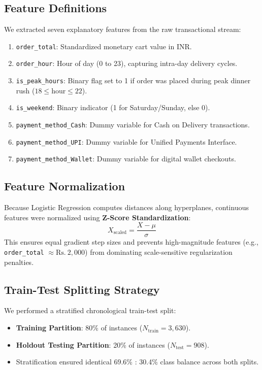 \documentclass[11pt,a4paper]{article}
\begin{document}
\subsection{Feature Definitions}
We extracted seven explanatory features from the raw transactional stream:
\begin{enumerate}
    \item \texttt{order\_total}: Standardized monetary cart value in INR.
    \item \texttt{order\_hour}: Hour of day (0 to 23), capturing intra-day delivery cycles.
    \item \texttt{is\_peak\_hours}: Binary flag set to 1 if order was placed during peak dinner rush ($18 \leq \text{hour} \leq 22$).
    \item \texttt{is\_weekend}: Binary indicator (1 for Saturday/Sunday, else 0).
    \item \texttt{payment\_method\_Cash}: Dummy variable for Cash on Delivery transactions.
    \item \texttt{payment\_method\_UPI}: Dummy variable for Unified Payments Interface.
    \item \texttt{payment\_method\_Wallet}: Dummy variable for digital wallet checkouts.
\end{enumerate}

\subsection{Feature Normalization}
Because Logistic Regression computes distances along hyperplanes, continuous features were normalized using \textbf{Z-Score Standardization}:
\begin{equation}
    X_{\text{scaled}} = \frac{X - \mu}{\sigma}
\end{equation}
This ensures equal gradient step sizes and prevents high-magnitude features (e.g., \texttt{order\_total} $\approx \text{Rs.}~2,000$) from dominating scale-sensitive regularization penalties.

\subsection{Train-Test Splitting Strategy}
We performed a stratified chronological train-test split:
\begin{itemize}
    \item \textbf{Training Partition}: 80\% of instances ($N_{\text{train}} = 3,630$).
    \item \textbf{Holdout Testing Partition}: 20\% of instances ($N_{\text{test}} = 908$).
    \item Stratification ensured identical 69.6\% : 30.4\% class balance across both splits.
\end{itemize}
\end{document}
